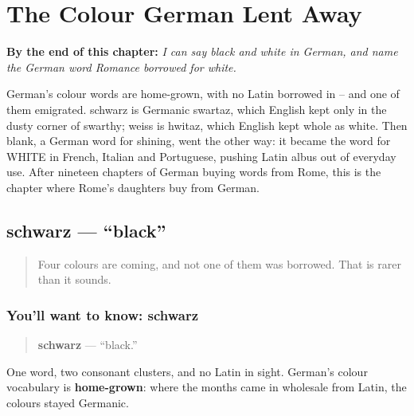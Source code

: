 
\chapter{The Colour German Lent Away}
\label{ch:schwarz-weiss}

\begin{chapteropening}
\textbf{By the end of this chapter:} \emph{I can say black and white in German, and name the German word Romance borrowed for white.}

German's colour words are home-grown, with no Latin borrowed in -- and one of them emigrated. schwarz is Germanic swartaz, which English kept only in the dusty corner of swarthy; weiss is hwitaz, which English kept whole as white. Then blank, a German word for shining, went the other way: it became the word for WHITE in French, Italian and Portuguese, pushing Latin albus out of everyday use. After nineteen chapters of German buying words from Rome, this is the chapter where Rome's daughters buy from German.
\end{chapteropening}

\section[schwarz]{schwarz — \textquotedblleft{}black\textquotedblright{}}

\label{lesson:GE-C13-schwarz}



\begin{quote}
Four colours are coming, and not one of them was borrowed. That is rarer than it sounds.
\end{quote}

\subsection*{You'll want to know: schwarz}
\begin{quote}
\textbf{schwarz} — \textquotedblleft{}black.\textquotedblright{}
\end{quote}

One word, two consonant clusters, and no Latin in sight. German's colour vocabulary is \textbf{home-grown}: where the months came in wholesale from Latin, the colours stayed Germanic.

